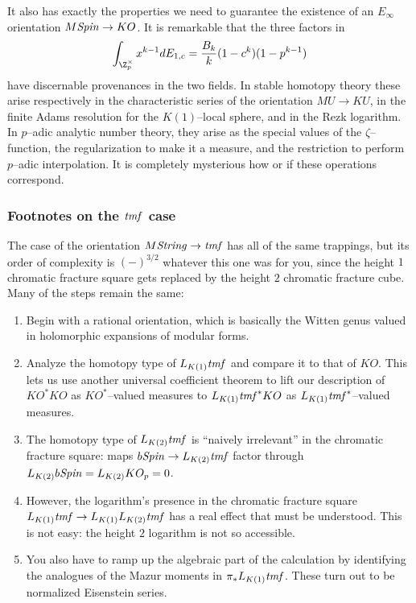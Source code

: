 It also has exactly the properties we need to guarantee the existence of an $E_\infty$ orientation $M\mathit{Spin} \to KO$.  It is remarkable that the three factors in \[\int_{\Z_p^\times} x^{k-1} d E_{1, c} = \frac{B_k}{k} (1 - c^k)(1 - p^{k-1})\] have discernable provenances in the two fields.  In stable homotopy theory these arise respectively in the characteristic series of the orientation $MU \to KU$, in the finite Adams resolution for the $K(1)$--local sphere, and in the Rezk logarithm.  In $p$--adic analytic number theory, they arise as the special values of the $\zeta$--function, the regularization to make it a measure, and the restriction to perform $p$--adic interpolation.  It is completely mysterious how or if these operations correspond.


\subsubsection{Footnotes on the $\mathit{tmf}$ case}

The case of the orientation $M\mathit{String} \to \mathit{tmf}$ has all of the same trappings, but its order of complexity is $(-)^{3/2}$ whatever this one was for you, since the height $1$ chromatic fracture square gets replaced by the height $2$ chromatic fracture cube.  Many of the steps remain the same:
\begin{enumerate}
    \item Begin with a rational orientation, which is basically the Witten genus valued in holomorphic expansions of modular forms.
    \item Analyze the homotopy type of $L_{K(1)} \mathit{tmf}$ and compare it to that of $KO$.  This lets us use another universal coefficient theorem to lift our description of $KO^* KO$ as $KO^*$--valued measures to $L_{K(1)} \mathit{tmf}^* KO$ as $L_{K(1)} \mathit{tmf}^*$--valued measures.
    \item The homotopy type of $L_{K(2)} \mathit{tmf}$ is ``naively irrelevant'' in the chromatic fracture square: maps $b\mathit{Spin} \to L_{K(2)} \mathit{tmf}$ factor through $L_{K(2)} b\mathit{Spin} = L_{K(2)} KO_p = 0$.
    \item However, the logarithm's presence in the chromatic fracture square $L_{K(1)} \mathit{tmf} \to L_{K(1)} L_{K(2)} \mathit{tmf}$ has a real effect that must be understood.  This is not easy: the height $2$ logarithm is not so accessible.
    \item You also have to ramp up the algebraic part of the calculation by identifying the analogues of the Mazur moments in $\pi_* L_{K(1)} \mathit{tmf}$.  These turn out to be normalized Eisenstein series.
\end{enumerate}

